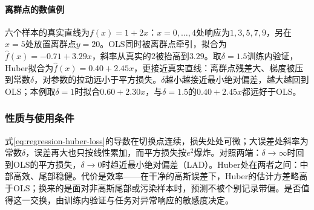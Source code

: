\paragraph{离群点的数值例}

六个样本的真实直线为$f(x)=1+2x$：$x=0,\ldots,4$处响应为$1,3,5,7,9$，另在$x=5$处放置离群点$y=20$。OLS同时被离群点牵引，拟合为$\widehat f(x)=-0.71+3.29x$，斜率从真实的$2$被抬高到$3.29$。取$\delta=1.5$训练内验证，Huber拟合为$\widehat f(x)=0.40+2.45x$，更接近真实直线：离群点残差大、梯度被压到常数$\delta$，对参数的拉动远小于平方损失。$\delta$越小越接近最小绝对偏差，越大越回到OLS；本例取$\delta=1$时拟合$0.60+2.30x$，与$\delta=1.5$的$0.40+2.45x$都远好于OLS。

\subsubsection{性质与使用条件}
\label{sec:regression-huber-theory}

式\eqref{eq:regression-huber-loss}的导数在切换点连续，损失处处可微；大误差处斜率为常数$\delta$，误差再大也只按线性累加，而平方损失按$e^2$爆炸。对照两端：$\delta\to\infty$时回到OLS的平方损失，$\delta\to0$时趋近最小绝对偏差（LAD）。Huber处在两者之间：中部高效、尾部稳健。代价是效率——在干净的高斯误差下，Huber的估计方差略高于OLS；换来的是面对非高斯尾部或污染样本时，预测不被个别记录带偏。是否值得这一交换，由训练内验证与任务对异常响应的敏感度决定。

